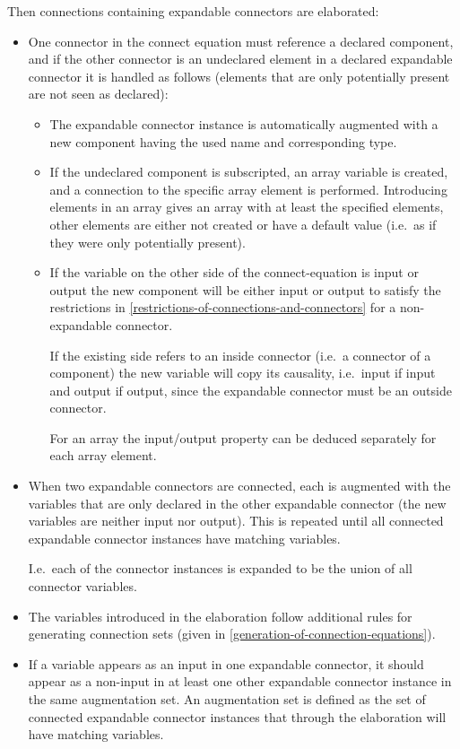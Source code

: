 Then connections containing expandable connectors are elaborated:
\begin{itemize}
\item
  One connector in the connect equation must reference a declared
  component, and if the other connector is an undeclared element in a
  declared expandable connector it is handled as follows (elements that
  are only potentially present are not seen as declared):
\begin{itemize}
\item
  The expandable connector instance is automatically augmented with a
  new component having the used name and corresponding type.
\item
  If the undeclared component is subscripted, an array variable is
  created, and a connection to the specific array element is performed.
  Introducing elements in an array gives an array with at least the
  specified elements, other elements are either not created or have a
  default value (i.e.\ as if they were only potentially present).
\item
  If the variable on the other side of the connect-equation is input or
  output the new component will be either input or output to satisfy the
  restrictions in \autoref{restrictions-of-connections-and-connectors} for a non-expandable connector.
  \begin{nonnormative}
  If the existing side refers to an inside connector (i.e.\ a connector of a component) the new variable will copy its causality, i.e.\ input
  if input and output if output, since the expandable connector must be an outside connector.
  \end{nonnormative}
  For an array the input/output property can be deduced separately for each array element.
\end{itemize}
\item
  When two expandable connectors are connected, each is augmented with
  the variables that are only declared in the other expandable connector
  (the new variables are neither input nor output). This is repeated
  until all connected expandable connector instances have matching
  variables.
  \begin{nonnormative}
  I.e.\ each of the connector instances is expanded to be the union of all connector variables.
  \end{nonnormative}
\item
  The variables introduced in the elaboration follow additional rules
  for generating connection sets (given in \autoref{generation-of-connection-equations}).
\item
  If a variable appears as an input in one expandable connector, it
  should appear as a non-input in at least one other expandable
  connector instance in the same augmentation set. An augmentation set
  is defined as the set of connected expandable connector instances that
  through the elaboration will have matching variables.


\end{itemize}
